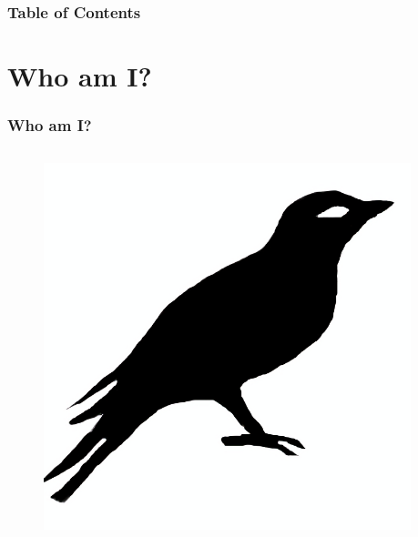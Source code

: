 \frame{\maketitle}

\begin{frame}
  \frametitle{Table of Contents}

  \tableofcontents
\end{frame}

\section{Who am I?}
\begin{frame}
  \frametitle{Who am I?}
  
  \begin{columns}
    \begin{column}{0.3\textwidth}
      \centering
      \begin{figure}
        \includegraphics[width=0.95\textwidth]{img/bird2x.png}
      \end{figure}


\end{column}
\end{columns}
\end{frame}
